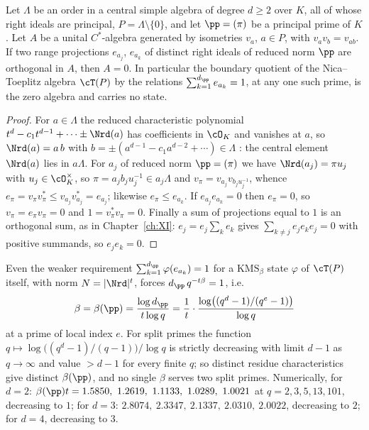 \begin{theorem}\label{XII:thm:noboundary}
Let $\Lambda$ be an order in a central simple algebra of degree $d\ge2$ over $K$, all of
whose right ideals are principal, $P=\Lambda\setminus\{0\}$, and let $\pp=(\pi)$ be a
principal prime of $K$. Let $A$ be a unital $C^*$-algebra generated by isometries $v_a$,
$a\in P$, with $v_av_b=v_{ab}$. If two range projections $e_{a_j}$, $e_{a_k}$ of distinct
right ideals of reduced norm $\pp$ are orthogonal in $A$, then $A=0$. In particular the
boundary quotient of the Nica--Toeplitz algebra $\cT(P)$ by the relations
$\sum_{k=1}^{d_\pp}e_{a_k}=1$, at any one such prime, is the zero algebra and carries no
state.
\end{theorem}

\begin{proof}
For $a\in\Lambda$ the reduced characteristic polynomial $t^d-c_1t^{d-1}+\cdots\pm\Nrd(a)$ has
coefficients in $\cO_K$ and vanishes at $a$, so $\Nrd(a)=a\,b$ with
$b=\pm(a^{d-1}-c_1a^{d-2}+\cdots)\in\Lambda$ \cite[\S9]{Reiner}: the central element $\Nrd(a)$
lies in $a\Lambda$. For $a_j$ of reduced norm $\pp=(\pi)$ we have $\Nrd(a_j)=\pi u_j$ with
$u_j\in\cO_K^\times$, so $\pi=a_jb_ju_j^{-1}\in a_j\Lambda$ and $v_\pi=v_{a_j}v_{b_ju_j^{-1}}$,
whence $e_\pi=v_\pi v_\pi^*\le v_{a_j}v_{a_j}^*=e_{a_j}$; likewise $e_\pi\le e_{a_k}$. If
$e_{a_j}e_{a_k}=0$ then $e_\pi=0$, so $v_\pi=e_\pi v_\pi=0$ and $1=v_\pi^*v_\pi=0$. Finally a
sum of projections equal to $1$ is an orthogonal sum, as in Chapter~\ref{ch:XI}: $e_j=e_j\sum_ke_k$ gives
$\sum_{k\ne j}e_je_ke_j=0$ with positive summands, so $e_je_k=0$.
\end{proof}

\begin{remark}\label{XII:rem:betavals}
Even the weaker requirement $\sum_{k=1}^{d_\pp}\varphi(e_{a_k})=1$ for a $\mathrm{KMS}_\beta$
state $\varphi$ of $\cT(P)$ itself, with norm $N=|\Nrd|^t$, forces $d_\pp\,q^{-t\beta}=1$, i.e.
\[
\beta=\beta(\pp)=\frac{\log d_\pp}{t\log q}=\frac{1}{t}\cdot\frac{\log\bigl((q^d-1)/(q^e-1)\bigr)}{\log q}
\]
at a prime of local index $e$. For split primes the function
$q\mapsto\log\bigl((q^d-1)/(q-1)\bigr)/\log q$ is strictly decreasing with limit $d-1$ as
$q\to\infty$ and value $>d-1$ for every finite $q$; so distinct residue characteristics give
distinct $\beta(\pp)$, and no single $\beta$ serves two split primes. Numerically, for
$d=2$: $\beta(\pp)t=1.5850,\ 1.2619,\ 1.1133,\ 1.0289,\ 1.0021$ at $q=2,3,5,13,101$, decreasing
to $1$; for $d=3$: $2.8074,\ 2.3347,\ 2.1337,\ 2.0310,\ 2.0022$, decreasing to $2$; for $d=4$,
decreasing to $3$.
\end{remark}

